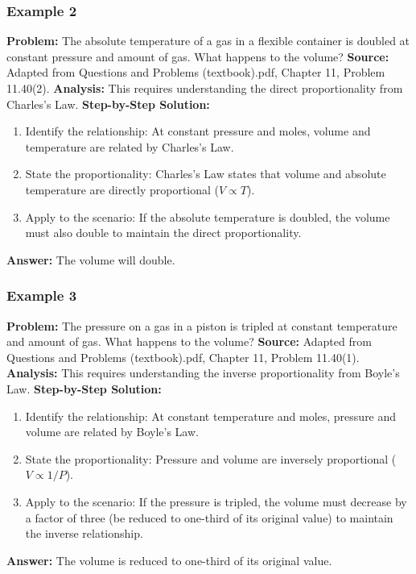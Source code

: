 \documentclass{article}
\begin{document}
\subsubsection{Example 2}
\textbf{Problem:} The absolute temperature of a gas in a flexible container is doubled at constant pressure and amount of gas. What happens to the volume?
\textbf{Source:} Adapted from Questions and Problems (textbook).pdf, Chapter 11, Problem 11.40(2).
\textbf{Analysis:} This requires understanding the direct proportionality from Charles's Law.
\textbf{Step-by-Step Solution:}
\begin{enumerate}
    \item Identify the relationship: At constant pressure and moles, volume and temperature are related by Charles's Law.
    \item State the proportionality: Charles's Law states that volume and absolute temperature are directly proportional ($V \propto T$).
    \item Apply to the scenario: If the absolute temperature is doubled, the volume must also double to maintain the direct proportionality.
\end{enumerate}
\textbf{Answer:} The volume will double.

\subsubsection{Example 3}
\textbf{Problem:} The pressure on a gas in a piston is tripled at constant temperature and amount of gas. What happens to the volume?
\textbf{Source:} Adapted from Questions and Problems (textbook).pdf, Chapter 11, Problem 11.40(1).
\textbf{Analysis:} This requires understanding the inverse proportionality from Boyle's Law.
\textbf{Step-by-Step Solution:}
\begin{enumerate}
    \item Identify the relationship: At constant temperature and moles, pressure and volume are related by Boyle's Law.
    \item State the proportionality: Pressure and volume are inversely proportional ($V \propto 1/P$).
    \item Apply to the scenario: If the pressure is tripled, the volume must decrease by a factor of three (be reduced to one-third of its original value) to maintain the inverse relationship.
\end{enumerate}
\textbf{Answer:} The volume is reduced to one-third of its original value.
\end{document}
